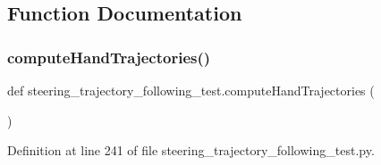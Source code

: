 \subsection{Function Documentation}
\mbox{\label{namespacesteering__trajectory__following__test_a378cc54eed1c58dc9d547aea3d6f14c9}} 
\subsubsection{\texorpdfstring{computeHandTrajectories()}{computeHandTrajectories()}}
{\footnotesize\ttfamily def steering\+\_\+trajectory\+\_\+following\+\_\+test.\+compute\+Hand\+Trajectories (\begin{DoxyParamCaption}{ }\end{DoxyParamCaption})}



Definition at line 241 of file steering\+\_\+trajectory\+\_\+following\+\_\+test.\+py.


